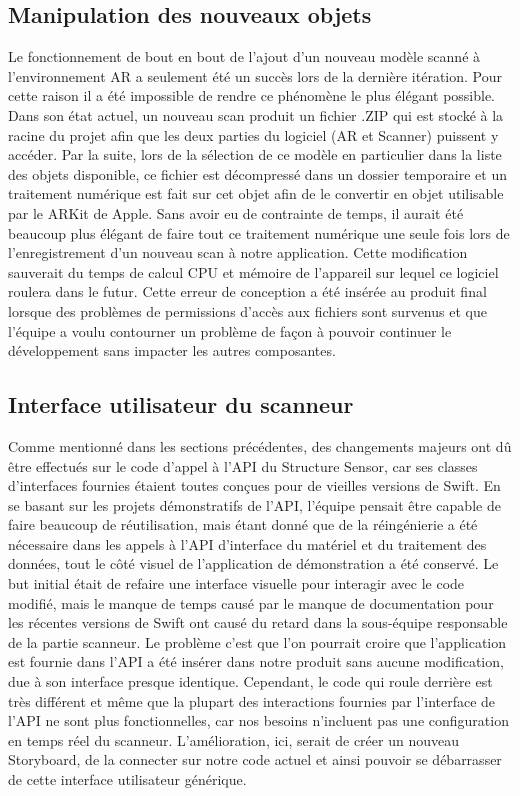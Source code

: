 \documentclass[rapport.tex]{subfiles}
\begin{document}
\subsection*{Manipulation des nouveaux objets}
Le fonctionnement de bout en bout de l’ajout d’un nouveau modèle scanné à l'environnement AR a seulement été un succès lors de la dernière itération. Pour cette raison il a été impossible de rendre ce phénomène le plus élégant possible. Dans son état actuel, un nouveau scan produit un fichier .ZIP qui est stocké à la racine du projet afin que les deux parties du logiciel (AR et Scanner) puissent y accéder. Par la suite, lors de la sélection de ce modèle en particulier dans la liste des objets disponible, ce fichier est décompressé dans un dossier temporaire et un traitement numérique est fait sur cet objet afin de le convertir en objet utilisable par le ARKit de Apple. Sans avoir eu de contrainte de temps, il aurait été beaucoup plus élégant de faire tout ce traitement numérique une seule fois lors de l’enregistrement d’un nouveau scan à notre application. Cette modification sauverait du temps de calcul CPU et mémoire de l’appareil sur lequel ce logiciel roulera dans le futur. Cette erreur de conception a été insérée au produit final lorsque des problèmes de permissions d’accès aux fichiers sont survenus et que l’équipe a voulu contourner un problème de façon à pouvoir continuer le développement sans impacter les autres composantes.
\subsection*{Interface utilisateur du scanneur}
Comme mentionné dans les sections précédentes, des changements majeurs ont dû être effectués sur le code d’appel à l’API du Structure Sensor, car ses classes d’interfaces fournies étaient toutes conçues pour de vieilles versions de Swift. En se basant sur les projets démonstratifs de l’API, l’équipe pensait être capable de faire beaucoup de réutilisation, mais étant donné que de la réingénierie a été nécessaire dans les appels à l’API d'interface du matériel et du traitement des données, tout le côté visuel de l’application de démonstration a été conservé. Le but initial était de refaire une interface visuelle pour interagir avec le code modifié, mais le manque de temps causé par le manque de documentation pour les récentes versions de Swift ont causé du retard dans la sous-équipe responsable de la partie scanneur. Le problème c’est que l’on pourrait croire que l’application est fournie dans l’API a été insérer dans notre produit sans aucune modification, due à son interface presque identique. Cependant, le code qui roule derrière est très différent et même que la plupart des interactions fournies par l’interface de l’API ne sont plus fonctionnelles, car nos besoins n'incluent pas une configuration en temps réel du scanneur. L’amélioration, ici, serait de créer un nouveau Storyboard, de la connecter sur notre code actuel et ainsi pouvoir se débarrasser de cette interface utilisateur générique.
\end{document}
